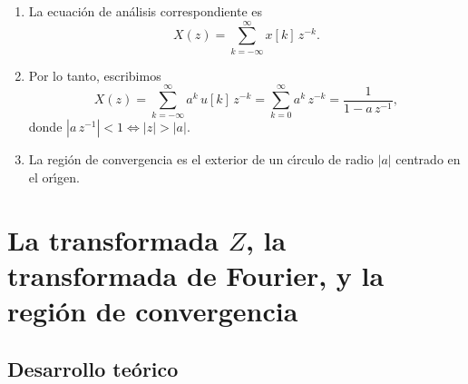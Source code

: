 \begin{enumerate}
\item La ecuaci\'{o}n de an\'{a}lisis correspondiente es
\begin{equation}
X\left( z\right) =\sum_{k=-\infty }^{\infty }x\left[ k\right] \, z^{-k}.
\end{equation}

\item Por lo tanto, escribimos
\begin{equation}
  X\left( z\right) = \sum_{k=-\infty}^{\infty} a^{k} \, u[k] \, z^{-k} = \sum_{k=0}^{\infty} a^k \, z^{-k} = 
    \frac{1}{1-a \, z^{-1}},
\end{equation}
donde $ \left| a \, z^{-1}\right| <1 \Leftrightarrow \left| z\right| >\left| a\right|$.

\item La regi\'{o}n de convergencia es el exterior de un c\'{\i}rculo de radio $\left| a\right| $ 
centrado en el or\'{\i}gen.

\end{enumerate}

\section{La transformada $Z$, la transformada de Fourier, y la regi\'{o}n de convergencia} \label{zetaconv}

\subsection{Desarrollo te\'{o}rico}

